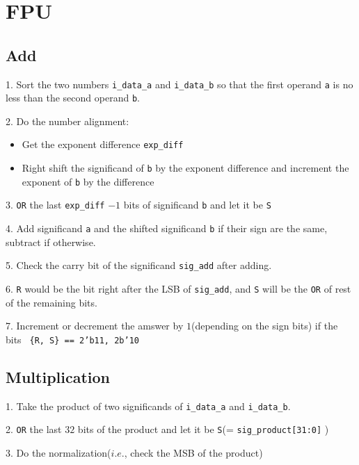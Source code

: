 \documentclass[11pt,a4paper]{article}
\begin{document}
\section{FPU}%
\label{sec:FPU}

\subsection{Add}%
\label{sub:Add}

\hspace{0.6cm}1. Sort the two numbers \texttt{i\_data\_a} and \texttt{i\_data\_b} so that the first operand  \texttt{a} is no less than the second operand \texttt{b}.  \n

2. Do the number alignment: \n
    \begin{itemize}
        \item Get the exponent difference \texttt{exp\_diff}
        \item Right shift the significand of \texttt{b} by the exponent difference and increment the exponent of \texttt{b} by the difference 
    \end{itemize}\n

3. \texttt{OR} the last \texttt{exp\_diff} $- 1 $ bits of significand  \texttt{b} and let it be \texttt{S}\n

4. Add significand \texttt{a} and the shifted significand \texttt{b} if their sign are the same, subtract if otherwise.\n

5. Check the carry bit of the significand \texttt{sig\_add} after adding.\n

6. \texttt{R} would be the bit right after the LSB of \texttt{sig\_add}, and \texttt{S} will be the \texttt{OR} of rest of the remaining bits.\n

7. Increment or decrement the amswer by $1$(depending on the sign bits) if the bits \texttt{ \{R, S\} == 2'b11, 2b'10}\n

\subsection{Multiplication}%
\label{sub:Multiplication}

\hspace{0.6cm}1. Take the product of two significands of \texttt{i\_data\_a} and \texttt{i\_data\_b}.\n

2. \texttt{OR} the last $32$ bits of the product and let it be \texttt{S}(= \texttt{sig\_product[31:0]} )\n

3. Do the normalization($i.e.$, check the MSB of the product)\n
\end{document}

